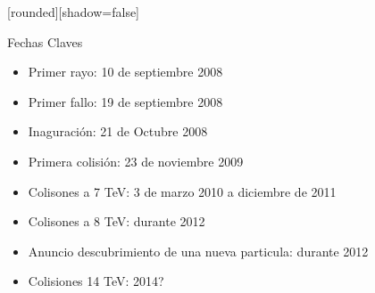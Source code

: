 \documentclass[%
xcolor=pdftex,dvipsnames,table%
]{beamer}
\begin{document}
{\begin{frame}
\begin{columns}
\begin{block}
   \end{block}
\end{columns}
 \end{frame}
}
{
[rounded][shadow=false]
 \begin{frame}
   \begin{block}{Fechas Claves}
     \begin{itemize}
     \item \alert{Primer rayo:} 10 de septiembre 2008
     \item \alert{Primer fallo:} 19 de septiembre 2008
     \item \alert{Inaguraci\'on:} 21 de Octubre 2008
     \item \alert{Primera colisi\'on:} 23 de noviembre 2009
     \item \alert{Colisones a 7 TeV:} 3 de marzo 2010 a diciembre de 2011
     \item \alert{Colisones a 8 TeV:} durante 2012
     \item \alert{Anuncio descubrimiento de una nueva particula:} durante 2012
     \item \alert{Colisiones 14 TeV:} 2014?
     \end{itemize}
   \end{block}
 \end{frame}
}
\end{document}
